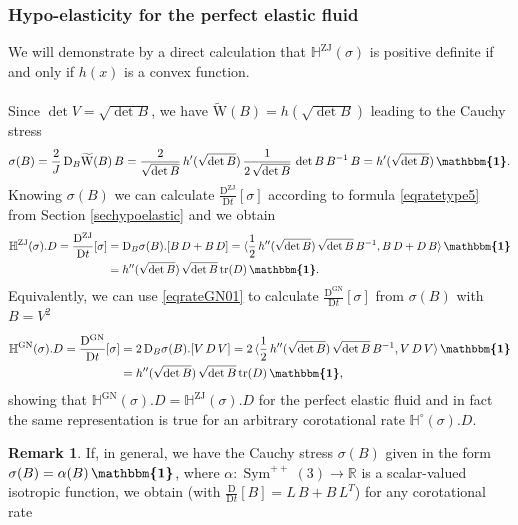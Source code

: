 \documentclass[10pt]{article}
\newcounter{theoremCounter}
\numberwithin{theoremCounter}{section}
\theoremstyle{plain}
\theoremstyle{definition}
\newtheorem{rem}[theoremCounter]{Remark}
\newcommand{\id}{{\boldsymbol{\mathbbm{1}}}}
\newcommand{\R}{\mathbb{R}}
\newcommand{\DD}{\mathrm{D}}
\newcommand{\WW}{\mathrm{W}}
\DeclareMathOperator{\Sym}{Sym}
\DeclareMathOperator{\tr}{tr}
\DeclareMathOperator{\ZJ}{ZJ}
\DeclareMathOperator{\GN}{GN}
\def\tr{\textnormal{tr}}
\def\H{\mathbb{H}}
\numberwithin{equation}{section}
\begin{document}
\begin{appendix}
\subsubsection{Hypo-elasticity for the perfect elastic fluid} \label{apphypcomp}
%
We will demonstrate by a direct calculation that $\H^{\ZJ}(\sigma)$ is positive definite if and only if $h(x)$ is a convex function. \\
\\
Since $\det V = \sqrt{\det B}$, we have $\widetilde{\WW}(B) = h(\sqrt{\det B})$ leading to the Cauchy stress
	\begin{equation}
	\sigma(B) = \frac{2}{J} \, \DD_B \widetilde{\WW}(B) \, B = \frac{2}{\sqrt{\det B}} \, h'(\sqrt{\det B}) \, \frac{1}{2 \, \sqrt{\det B}} \, \det B \, B^{-1} \, B = h'(\sqrt{\det B}) \, \id.
	\end{equation}
Knowing $\sigma(B)$ we can calculate $\frac{\DD^{\ZJ}}{\DD t}[\sigma]$ according to formula \eqref{eqratetype5} from Section \ref{sechypoelastic} and we obtain
	\begin{equation}
	\begin{alignedat}{2}
	\H^{\ZJ}(\sigma).D = \frac{\DD^{\ZJ}}{\DD t}[\sigma] &= \DD_B \sigma(B).[B \, D + B \, D] = \langle \frac12 \, h''(\sqrt{\det B}) \, \sqrt{\det B} \, B^{-1}, B \, D + D \, B \rangle \, \id \\
	&= h''(\sqrt{\det B}) \, \sqrt{\det B} \, \tr(D) \, \id.
	\end{alignedat}
	\end{equation}
Equivalently, we can use \eqref{eqrateGN01} to calculate $\frac{\DD^{\GN}}{\DD t}[\sigma]$ from $\sigma(B)$ with $B = V^2$
	\begin{equation}
	\begin{alignedat}{2}
	\H^{\GN}(\sigma).D = \frac{\DD^{\GN}}{\DD t}[\sigma] &= 2 \, \DD_B \sigma(B).[V \, D \, V] = 2 \, \langle \frac12 \, h''(\sqrt{\det B}) \, \sqrt{\det B} \, B^{-1}, V \, D \, V \rangle \, \id \\
	&= h''(\sqrt{\det B}) \, \sqrt{\det B} \, \tr(D) \, \id,
	\end{alignedat}
	\end{equation}
showing that $\H^{\GN}(\sigma).D = \H^{\ZJ}(\sigma).D$ for the perfect elastic fluid and in fact the same representation is true for an arbitrary corotational rate $\H^{\circ}(\sigma).D$.
%
\begin{rem}
If, in general, we have the Cauchy stress $\sigma(B)$ given in the form $\sigma(B) = \alpha(B) \, \id$, where $\alpha: \Sym^{++}(3) \to \R$ is a scalar-valued isotropic function, we obtain (with $\frac{\DD}{\DD t}[B] = L \, B + B \, L^T$) for any corotational rate

\end{rem}
\end{appendix}
\end{document}
